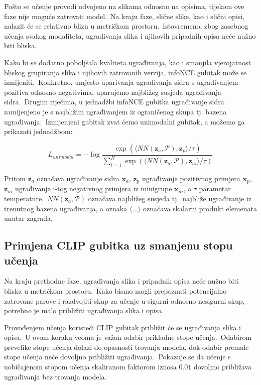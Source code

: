 \documentclass[times, utf8, seminar, numeric]{fer}
\begin{document}
Pošto se učenje provodi odvojeno na slikama odnosno na opisima, tijekom ove faze nije moguće zatrovati model.\ 
Na kraju faze, slične slike, kao i slični opisi, nalazit će se relativno blizu u metričkom prostoru.\ Istovremeno, zbog zasebnog učenja svakog modaliteta, ugrađivanja slika i njihovih pripadnih opisa neće nužno biti bliska.\ 
  
Kako bi se dodatno poboljšala kvaliteta ugrađivanja, kao i smanjila vjerojatnost bliskog grupiranja slika i njihovih zatrovanih verzija, infoNCE gubitak može se izmijeniti.\ 
Konkretno, umjesto uparivanja ugrađivanja sidra s ugrađivanjem pozitiva odnosno negativima, uparujemo najbližeg susjeda ugrađivanja sidra.\ 
Drugim riječima, u jednadžbi infoNCE gubitka ugrađivanje sidra zamijenjeno je s najbližim ugrađivanjem iz ograničenog skupa tj. bazena ugrađivanja.\ 
Izmijenjeni gubitak zvat ćemo unimodalni gubitak, a možemo ga prikazati jednadžbom:

\begin{equation}
    L_{unimodal} = - \log{\frac{\exp(\langle NN(\bm{z}_{a}, \mathcal{P}), \bm{z}_{p} \rangle / \tau)}{\sum_{i=1}^{N}{\exp(\langle NN(\bm{z}_{a}, \mathcal{P}), \bm{z}_{ni} \rangle / \tau)}}}
    \label{eq:unimodal_loss}
\end{equation}

Pritom $\bm{z}_{a}$ označava ugrađivanje sidra $\bm{x}_{a}$, $\bm{z}_{p}$ ugrađivanje pozitivnog primjera $\bm{x}_{p}$, $\bm{z}_{ni}$ ugrađivanje i-tog negativnog primjera iz minigrupe $\bm{x}_{ni}$, a $\tau$ parametar temperature.\ 
$NN(\bm{z}_{a}, \mathcal{P})$ označava najbližeg susjeda tj.\ najbliže ugrađivanje iz trenutnog bazena ugrađivanja, a oznaka $\langle ... \rangle$ označava skalarni produkt elemenata unutar zagrada.\

\subsection{Primjena CLIP gubitka uz smanjenu stopu učenja}

Na kraju prethodne faze, ugrađivanja slika i pripadnih opisa neće nužno biti bliska u metričkom prostoru.\ 
Kako bismo mogli prepoznati potencijalno zatrovane parove i razdvojiti skup za učenje u sigurni odnosno nesigurni skup, potrebno je malo približiti ugrađivanja slika i opisa.\
  
Provođenjem učenja koristeći CLIP gubitak približit će se ugrađivanja slika i opisa.\ 
U ovom koraku veoma je važan odabir prikladne stope učenja.\ Odabirom prevelike stope učenja dolazi do opasnosti trovanja modela, dok odabir premale stope učenja neće dovoljno približiti ugrađivanja.\ 
Pokazuje se da učenje s uobičajenom stopom učenja skaliranom faktorom iznosa $0.01$ dovoljno približava ugrađivanja bez trovanja modela.\
  
\end{document}
